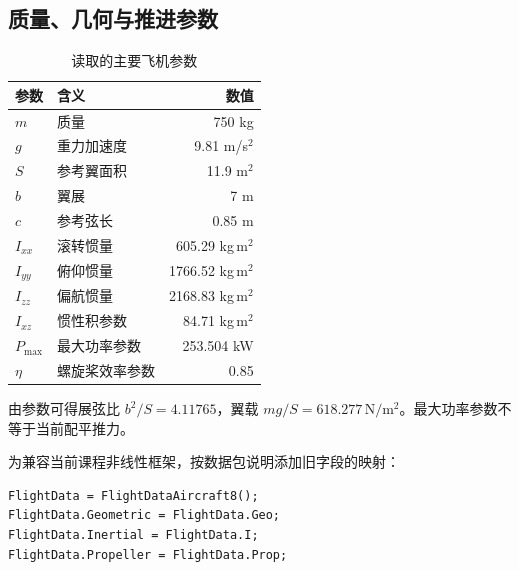 \documentclass[UTF8,a4paper,11pt,fontset=windows]{ctexart}
\begin{document}
\subsection{质量、几何与推进参数}
\begin{table}[H]\centering
\caption{读取的主要飞机参数}
\begin{tabular}{llr}\toprule
参数&含义&数值\\\midrule
$m$&质量&750 kg\\
$g$&重力加速度&9.81 m/s$^2$\\
$S$&参考翼面积&11.9 m$^2$\\
$b$&翼展&7 m\\
$c$&参考弦长&0.85 m\\
$I_{xx}$&滚转惯量&605.29 kg\,m$^2$\\
$I_{yy}$&俯仰惯量&1766.52 kg\,m$^2$\\
$I_{zz}$&偏航惯量&2168.83 kg\,m$^2$\\
$I_{xz}$&惯性积参数&84.71 kg\,m$^2$\\
$P_{\max}$&最大功率参数&253.504 kW\\
$\eta$&螺旋桨效率参数&0.85\\\bottomrule
\end{tabular}
\end{table}
由参数可得展弦比 $b^2/S=4.11765$，翼载 $mg/S=618.277\,\mathrm{N/m^2}$。最大功率参数不等于当前配平推力。

为兼容当前课程非线性框架，按数据包说明添加旧字段的映射：
\begin{lstlisting}
FlightData = FlightDataAircraft8();
FlightData.Geometric = FlightData.Geo;
FlightData.Inertial = FlightData.I;
FlightData.Propeller = FlightData.Prop;
\end{lstlisting}
\end{document}
